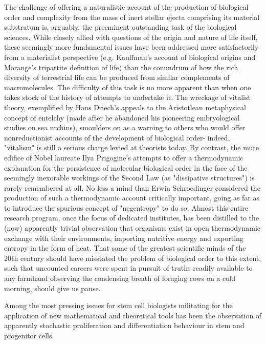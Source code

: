 The challenge of offering a naturalistic account of the production of biological order and complexity from the mass of inert stellar ejecta comprising its material substratum is, arguably, the preeminent outstanding task of the biological sciences. While closely allied with questions of the origin and nature of life itself, these seemingly more fundamental issues have been addressed more satisfactorily from a materialist perspective (e.g. Kauffman's account of biological origins and Morange's tripartite definition of life) than the conundrum of how the rich diversity of terrestrial life can be produced from similar complements of macromolecules. The difficulty of this task is no more apparent than when one takes stock of the history of attempts to undertake it. The wreckage of vitalist theory, exemplified by Hans Driech's appeals to the Aristotlean metaphysical concept of entelchy (made after he abandoned his pioneering embryological studies on sea urchins), smoulders on as a warning to others who would offer nonreductionist accounts of the development of biological order- indeed, "vitalism" is still a serious charge levied at theorists today. By contrast, the mute edifice of Nobel laureate Ilya Prigogine's attempts to offer a thermodynamic explanation for the persistence of molecular biological order in the face of the seemingly inexorable workings of the Second Law (as "dissipative structures") is rarely remembered at all. No less a mind than Erwin Schroedinger considered the production of such a thermodynamic account critically important, going as far as to introduce the spurious concept of "negentropy" to do so. Almost this entire research program, once the focus of dedicated institutes, has been distilled to the (now) apparently trivial observation that organisms exist in open thermodynamic exchange with their environments, importing nutritive energy and exporting entropy in the form of heat. That some of the greatest scientific minds of the 20th century should have misstated the problem of biological order to this extent, such that uncounted careers were spent in pursuit of truths readily available to any farmhand observing the condensing breath of foraging cows on a cold morning, should give us pause.

\bigskip

Among the most pressing issues for stem cell biologists militating for the application of new mathematical and theoretical tools has been the observation of apparently stochastic proliferation and differentiation behaviour in stem and progenitor cells.

